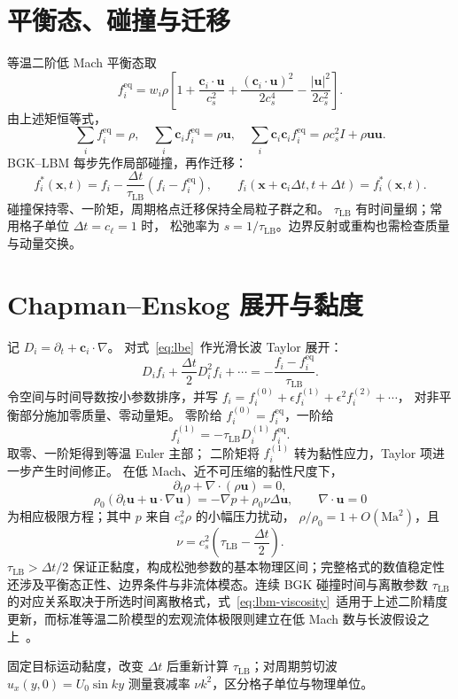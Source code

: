 \section{平衡态、碰撞与迁移}
等温二阶低 Mach 平衡态取
\begin{equation}\label{eq:lbm-eq}
f_i^{\mathrm{eq}}=w_i\rho\left[
1+\frac{\bm c_i\cdot\bm u}{c_s^2}
+\frac{(\bm c_i\cdot\bm u)^2}{2c_s^4}
-\frac{|\bm u|^2}{2c_s^2}\right].
\end{equation}
由上述矩恒等式，
\[
\sum_if_i^{\mathrm{eq}}=\rho,\quad
\sum_i\bm c_if_i^{\mathrm{eq}}=\rho\bm u,\quad
\sum_i\bm c_i\bm c_if_i^{\mathrm{eq}}=\rho c_s^2I+\rho\bm u\bm u.
\]
BGK--LBM 每步先作局部碰撞，再作迁移：
\begin{equation}\label{eq:lbe}
f_i^*(\bm x,t)=f_i-\frac{\Delta t}{\tau_{\mathrm{LB}}}(f_i-f_i^{\mathrm{eq}}),
\qquad
f_i(\bm x+\bm c_i\Delta t,t+\Delta t)=f_i^*(\bm x,t).
\end{equation}
碰撞保持零、一阶矩，周期格点迁移保持全局粒子群之和。
$\tau_{\mathrm{LB}}$ 有时间量纲；常用格子单位 $\Delta t=c_\ell=1$ 时，
松弛率为 $s=1/\tau_{\mathrm{LB}}$。边界反射或重构也需检查质量与动量交换。

\section{Chapman--Enskog 展开与黏度}
记 $D_i=\partial_t+\bm c_i\cdot\nabla$。
对式~\eqref{eq:lbe}~作光滑长波 Taylor 展开：
\[
D_if_i+\frac{\Delta t}{2}D_i^2f_i+\cdots
=-\frac{f_i-f_i^{\mathrm{eq}}}{\tau_{\mathrm{LB}}}.
\]
令空间与时间导数按小参数排序，并写
$f_i=f_i^{(0)}+\epsilon f_i^{(1)}+\epsilon^2f_i^{(2)}+\cdots$，
对非平衡部分施加零质量、零动量矩。
零阶给 $f_i^{(0)}=f_i^{\mathrm{eq}}$，一阶给
\[
f_i^{(1)}=-\tau_{\mathrm{LB}}D_i^{(1)}f_i^{\mathrm{eq}}.
\]
取零、一阶矩得到等温 Euler 主部；
二阶矩将 $f_i^{(1)}$ 转为黏性应力，Taylor 项进一步产生时间修正。
在低 Mach、近不可压缩的黏性尺度下，
\[
\partial_t\rho+\nabla\cdot(\rho\bm u)=0,
\]
\[
\rho_0(\partial_t\bm u+\bm u\cdot\nabla\bm u)
=-\nabla p+\rho_0\nu\Delta\bm u,\qquad
\nabla\cdot\bm u=0
\]
为相应极限方程；其中 $p$ 来自 $c_s^2\rho$ 的小幅压力扰动，
$\rho/\rho_0=1+O(\mathrm{Ma}^2)$，且
\begin{equation}\label{eq:lbm-viscosity}
\nu=c_s^2\left(\tau_{\mathrm{LB}}-\frac{\Delta t}{2}\right).
\end{equation}
$\tau_{\mathrm{LB}}>\Delta t/2$ 保证正黏度，构成松弛参数的基本物理区间；完整格式的数值稳定性还涉及平衡态正性、边界条件与非流体模态。连续 BGK 碰撞时间与离散参数 $\tau_{\mathrm{LB}}$ 的对应关系取决于所选时间离散格式，式~\eqref{eq:lbm-viscosity}~适用于上述二阶精度更新，而标准等温二阶模型的宏观流体极限则建立在低 Mach 数与长波假设之上~\cite{qian1992}。

{固定目标运动黏度，改变 $\Delta t$ 后重新计算 $\tau_{\mathrm{LB}}$；对周期剪切波 $u_x(y,0)=U_0\sin ky$ 测量衰减率 $\nu k^2$，区分格子单位与物理单位。}
